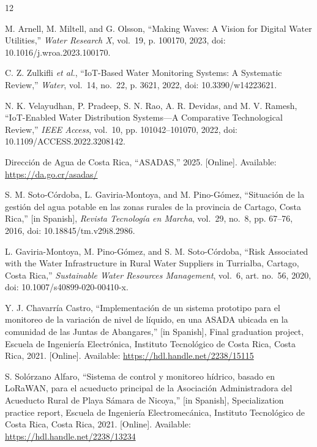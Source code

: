 \documentclass[conference]{IEEEtran}
\begin{document}
\begin{thebibliography}{12}

M. Arnell, M. Miltell, and G. Olsson, ``Making Waves: A Vision for Digital Water Utilities,'' \emph{Water Research X}, vol.~19, p. 100170, 2023, doi: 10.1016/j.wroa.2023.100170.

C. Z. Zulkifli \emph{et al.}, ``IoT-Based Water Monitoring Systems: A Systematic Review,'' \emph{Water}, vol.~14, no.~22, p. 3621, 2022, doi: 10.3390/w14223621.

N. K. Velayudhan, P. Pradeep, S. N. Rao, A. R. Devidas, and M. V. Ramesh, ``IoT-Enabled Water Distribution Systems---A Comparative Technological Review,'' \emph{IEEE Access}, vol.~10, pp. 101042--101070, 2022, doi: 10.1109/ACCESS.2022.3208142.

Dirección de Agua de Costa Rica, ``ASADAS,'' 2025. [Online]. Available: \url{https://da.go.cr/asadas/}

S. M. Soto-Córdoba, L. Gaviria-Montoya, and M. Pino-Gómez, ``Situación de la gestión del agua potable en las zonas rurales de la provincia de Cartago, Costa Rica,'' [in Spanish], \emph{Revista Tecnología en Marcha}, vol.~29, no.~8, pp. 67--76, 2016, doi: 10.18845/tm.v29i8.2986.

L. Gaviria-Montoya, M. Pino-Gómez, and S. M. Soto-Córdoba, ``Risk Associated with the Water Infrastructure in Rural Water Suppliers in Turrialba, Cartago, Costa Rica,'' \emph{Sustainable Water Resources Management}, vol.~6, art. no.~56, 2020, doi: 10.1007/s40899-020-00410-x.

Y. J. Chavarría Castro, ``Implementación de un sistema prototipo para el monitoreo de la variación de nivel de líquido, en una ASADA ubicada en la comunidad de las Juntas de Abangares,'' [in Spanish], Final graduation project, Escuela de Ingeniería Electrónica, Instituto Tecnológico de Costa Rica, Costa Rica, 2021. [Online]. Available: \url{https://hdl.handle.net/2238/15115}

S. Solórzano Alfaro, ``Sistema de control y monitoreo hídrico, basado en LoRaWAN, para el acueducto principal de la Asociación Administradora del Acueducto Rural de Playa Sámara de Nicoya,'' [in Spanish], Specialization practice report, Escuela de Ingeniería Electromecánica, Instituto Tecnológico de Costa Rica, Costa Rica, 2021. [Online]. Available: \url{https://hdl.handle.net/2238/13234}


\end{thebibliography}
\end{document}
